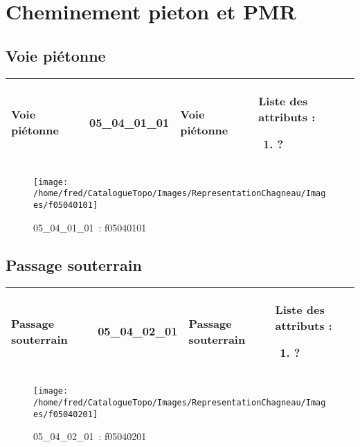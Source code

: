 \documentclass[12pt,titlepage]{book}
\begin{document}
\section{\large Cheminement pieton et PMR}
\subsection{Voie piétonne}
\noindent
\vspace{\baselineskip}

\renewcommand{\arraystretch}{1.2}
\begin{supertabular}{|p{10cm}|c|p{13cm}|p{12cm}|}
 Voie piétonne & 05\_04\_01\_01 & Voie piétonne & Liste des attributs :
\begin{enumerate}
  \item ?\end{enumerate}
\\
\hline
\end{supertabular}
\begin{figure}[h!]
  \hfill         %
  \begin{minipage}[t]{3cm}
    \begin{center}
      \texttt{[image: /home/fred/CatalogueTopo/Images/RepresentationChagneau/Images/f05040101]}
      \caption[~05\_04\_01\_01]{\small{05\_04\_01\_01~:} \tiny{f05040101}}\label{f05040101}
    \end{center}
  \end{minipage}
\end{figure}


\subsection{Passage souterrain}
\noindent
\vspace{\baselineskip}

\renewcommand{\arraystretch}{1.2}
\begin{supertabular}{|p{10cm}|c|p{13cm}|p{12cm}|}
 Passage souterrain & 05\_04\_02\_01 & Passage souterrain & Liste des attributs :
\begin{enumerate}
  \item ?\end{enumerate}
\\
\hline
\end{supertabular}
\begin{figure}[h!]
  \hfill         %
  \begin{minipage}[t]{3cm}
    \begin{center}
      \texttt{[image: /home/fred/CatalogueTopo/Images/RepresentationChagneau/Images/f05040201]}
      \caption[~05\_04\_02\_01]{\small{05\_04\_02\_01~:} \tiny{f05040201}}\label{f05040201}
    \end{center}
  \end{minipage}
\end{figure}
\end{document}
